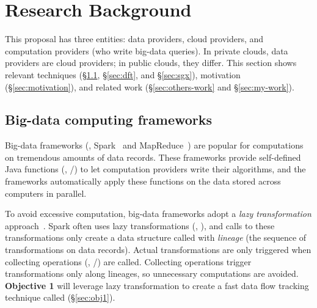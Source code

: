 \vspace{-.15in}\section{Research Background} 
\label{sec:background}\vspace{-.075in}

This proposal has three entities: data providers, cloud 
providers, and computation providers (who write big-data queries). In 
private clouds, data providers are cloud providers; in public clouds, 
they differ. This section shows relevant techniques (\S\ref{sec:bigdata}, 
\S\ref{sec:dft}, and \S\ref{sec:sgx}), motivation (\S\ref{sec:motivation}), and 
related work (\S\ref{sec:others-work} and \S\ref{sec:my-work}).


\vspace{-.15in}\subsection{Big-data computing frameworks} 
\label{sec:bigdata}\vspace{-.075in}

Big-data frameworks (\eg, Spark~\cite{nsdi12:spark} and 
MapReduce~\cite{mapreduce}) are popular for computations on tremendous amounts 
of data records. These frameworks provide self-defined Java functions (\eg, 
/) to let computation providers write their algorithms, 
and the frameworks automatically apply these functions on the data stored 
across computers in parallel.



To avoid excessive computation, big-data frameworks adopt a \emph{lazy 
transformation} approach~\cite{pig:vldb08,nsdi12:spark,osdi08:dryad}. Spark 
often uses lazy transformations (\eg, ), and calls to 
these transformations only create a data structure called  with 
\emph{lineage} (the sequence of transformations on data records).
Actual transformations are only triggered when collecting 
operations (\eg, /) are called. Collecting 
operations trigger transformations only along lineages, so unnecessary 
computations are avoided. \textbf{Objective 1} will leverage lazy 
transformation to create a fast data flow tracking technique called \lazyp 
(\S\ref{sec:obj1}).

